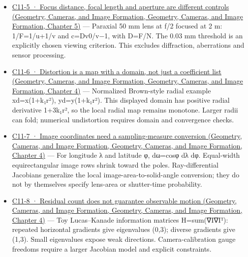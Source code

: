 \begin{itemize}
\item
  \href{../03-Geometry-Cameras-and-Image-Formation/main.pdf\#nameddest=02-foundations-ii-ch036-figure-c11-5-focus-distance-focal-length-and-aperture-are-different-controls}{C11-5 · Focus distance, focal length and aperture are different controls (Geometry, Cameras, and Image Formation, Geometry, Cameras, and Image Formation, Chapter 5)} --- Paraxial 50 mm lens at f/2 focused at 2 m: 1/F=1/u+1/v and c=D\textbar v0/v−1\textbar, with D=F/N. The 0.03 mm threshold is an explicitly chosen viewing criterion. This excludes diffraction, aberrations and sensor processing.
\item
  \href{../03-Geometry-Cameras-and-Image-Formation/main.pdf\#nameddest=02-foundations-ii-ch035-figure-c11-6-distortion-is-a-map-with-a-domain-not-just-a-coefficient-list}{C11-6 · Distortion is a map with a domain, not just a coefficient list (Geometry, Cameras, and Image Formation, Geometry, Cameras, and Image Formation, Chapter 4)} --- Normalized Brown-style radial example xd=x(1+k₁r²), yd=y(1+k₁r²). This displayed domain has positive radial derivative 1+3k₁r², so the local radial map remains monotone. Larger radii can fold; numerical undistortion requires domain and convergence checks.
\item
  \href{../03-Geometry-Cameras-and-Image-Formation/main.pdf\#nameddest=02-foundations-ii-ch035-figure-c11-7-image-coordinates-need-a-sampling-measure-conversion}{C11-7 · Image coordinates need a sampling-measure conversion (Geometry, Cameras, and Image Formation, Geometry, Cameras, and Image Formation, Chapter 4)} --- For longitude λ and latitude φ, dω=cosφ dλ dφ. Equal-width equirectangular image rows shrink toward the poles. Ray-differential Jacobians generalize the local image-area-to-solid-angle conversion; they do not by themselves specify lens-area or shutter-time probability.
\item
  \href{../03-Geometry-Cameras-and-Image-Formation/main.pdf\#nameddest=02-foundations-ii-ch035-figure-c11-8-residual-count-does-not-guarantee-observable-motion}{C11-8 · Residual count does not guarantee observable motion (Geometry, Cameras, and Image Formation, Geometry, Cameras, and Image Formation, Chapter 4)} --- Toy Lucas--Kanade information matrices H=sum(∇I∇Iᵀ): repeated horizontal gradients give eigenvalues (0,3); diverse gradients give (1,3). Small eigenvalues expose weak directions. Camera-calibration gauge freedoms require a larger Jacobian model and explicit constraints.
\end{itemize}

